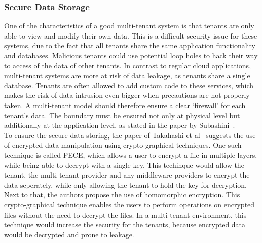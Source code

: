 \subsubsection{Secure Data Storage}
One of the characteristics of a good multi-tenant system is that tenants are only able to view and modify their own data. 
This is a difficult security issue for these systems, due to the fact that all tenants share the same application functionality and databases. 
Malicious tenants could use potential loop holes to hack their way to access of the data of other tenants. 
In contrast to regular cloud applications, multi-tenant systems are more at risk of data leakage, as tenants share a single database.
Tenants are often allowed to add custom code to these services, which makes the risk of data intrusion even bigger when precautions are not properly taken. 
A multi-tenant model should therefore ensure a clear ‘firewall’ for each tenant’s data.
The boundary must be ensured not only at physical level but additionally at the application level, as stated in the paper by Subashini~\cite{Subashini2011Security}.\\

To ensure the secure data storing, the paper of Takahashi et al~\cite{Takahashi2012Security} suggests the use of encrypted data manipulation using crypto-graphical techniques. 
One such technique is called \acf{PECE}, which allows a user to encrypt a file in multiple layers, while being able to decrypt with a single key.
This techinque would allow the tenant, the multi-tenant provider and any middleware providers to encrypt the data seperately, while only allowing the tenant to hold the key for decryption.
Next to that, the authors propose the use of homomorphic encryption. 
This crypto-graphical technique enables the users to perform operations on encrypted files without the need to decrypt the files.
In a multi-tenant environment, this technique would increase the security for the tenants, because encrypted data would be decrypted and prone to leakage.


